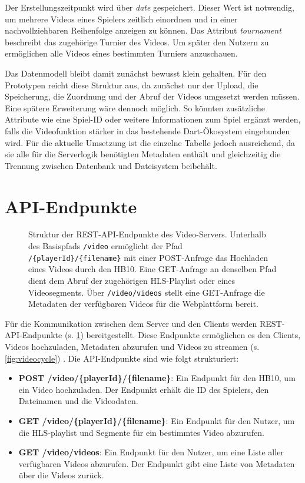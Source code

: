 Der Erstellungszeitpunkt wird über \textit{date} gespeichert. Dieser Wert ist notwendig, um mehrere Videos eines Spielers zeitlich einordnen und in einer nachvollziehbaren Reihenfolge anzeigen zu können. Das Attribut \textit{tournament} beschreibt das zugehörige Turnier des Videos. 
Um später den Nutzern zu ermöglichen alle Videos eines bestimmten Turniers anzuschauen.

Das Datenmodell bleibt damit zunächst bewusst klein gehalten. Für den Prototypen reicht diese Struktur aus, da zunächst nur der Upload, die Speicherung, die Zuordnung und der Abruf der Videos umgesetzt werden müssen. Eine spätere Erweiterung wäre dennoch möglich. 
So könnten zusätzliche Attribute wie eine Spiel-ID oder weitere Informationen zum Spiel ergänzt werden, falls die Videofunktion stärker in das bestehende Dart-Ökosystem eingebunden wird. Für die aktuelle Umsetzung ist die einzelne Tabelle jedoch ausreichend, 
da sie alle für die Serverlogik benötigten Metadaten enthält und gleichzeitig die Trennung zwischen Datenbank und Dateisystem beibehält.

\section{API-Endpunkte}

\begin{figure}[H]
    \centering
    
    \caption[REST-API-Endpunkte des Video-Servers]{Struktur der REST-API-Endpunkte des Video-Servers. Unterhalb des Basispfads \texttt{/video} ermöglicht der Pfad \texttt{/\{playerId\}/\{filename\}} mit einer POST-Anfrage das Hochladen eines Videos durch den HB10. 
    Eine GET-Anfrage an denselben Pfad dient dem Abruf der zugehörigen HLS-Playlist oder eines Videosegments. Über \texttt{/video/videos} stellt eine GET-Anfrage die Metadaten der verfügbaren Videos für die Webplattform bereit.}
    \label{fig:rest}
\end{figure}

Für die Kommunikation zwischen dem Server und den Clients werden REST-API-Endpunkte (s. \cref{fig:rest}) bereitgestellt. Diese Endpunkte ermöglichen es den Clients, Videos hochzuladen, Metadaten abzurufen und Videos zu streamen (s. \cref{fig:videocycle}) . Die API-Endpunkte sind wie folgt strukturiert:

\begin{itemize}
    \item \textbf{POST /video/\{playerId\}/\{filename\}}: Ein Endpunkt für den HB10, um ein Video hochzuladen. Der Endpunkt erhält die ID des Spielers, den Dateinamen und die Videodaten.
    \item \textbf{GET /video/\{playerId\}/\{filename\}}: Ein Endpunkt für den Nutzer, um die HLS-playlist und Segmente für ein bestimmtes Video abzurufen.
    \item \textbf{GET /video/videos}: Ein Endpunkt für den Nutzer, um eine Liste aller verfügbaren Videos abzurufen. Der Endpunkt gibt eine Liste von Metadaten über die Videos zurück.
\end{itemize}

